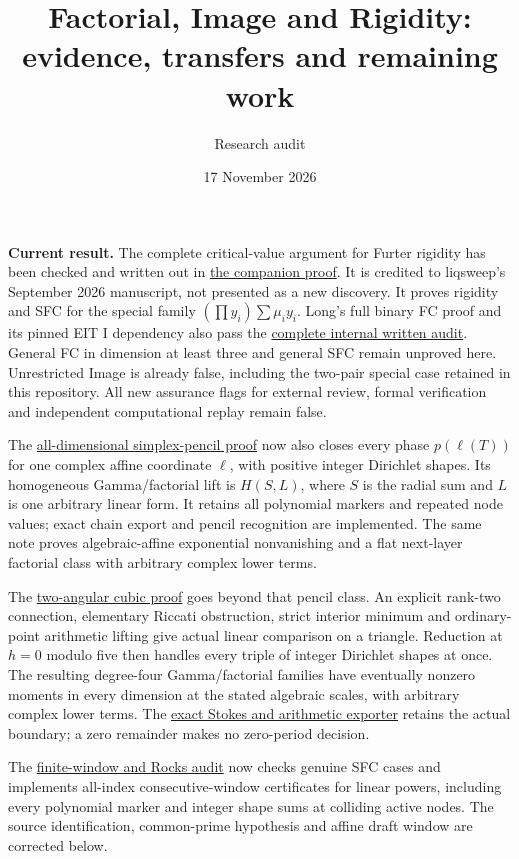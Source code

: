 \documentclass[11pt]{article}
\title{Factorial, Image and Rigidity: evidence, transfers and remaining work}
\author{Research audit}
\date{17 November 2026}
\begin{document}
\maketitle

\noindent\textbf{Current result.}
The complete critical-value argument for Furter rigidity has been checked
and written out in \href{RIGIDITY_CRITICAL_VALUES.tex}{the companion proof}.
It is credited to liqsweep's September 2026 manuscript, not presented as a
new discovery. It proves rigidity and SFC for the special family
$(\prod y_i)\sum\mu_i y_i$. Long's full binary FC proof and its pinned EIT I
dependency also pass the \href{LONG_EIT_AND_FC2_AUDIT.tex}{complete internal
written audit}. General FC in dimension at least three and general SFC
remain unproved here.
Unrestricted Image is already false, including the two-pair special case
retained in this repository. All new assurance flags for external review,
formal verification and independent computational replay remain false.

The \href{SIMPLEX_PENCILS_AND_AFFINE_LIMITS.tex}{all-dimensional simplex-pencil
proof} now also closes every phase $p(\ell(T))$ for one complex affine
coordinate $\ell$, with positive integer Dirichlet shapes. Its homogeneous
Gamma/factorial lift is $H(S,L)$, where $S$ is the radial sum and $L$ is
one arbitrary linear form. It retains all polynomial markers and repeated
node values; exact chain export and pencil recognition are implemented.
The same note proves algebraic-affine exponential nonvanishing and a flat
next-layer factorial class with arbitrary complex lower terms.

The \href{TWO_ANGULAR_COORDINATES.tex}{two-angular cubic proof} goes beyond
that pencil class. An explicit rank-two connection, elementary Riccati
obstruction, strict interior minimum and ordinary-point arithmetic lifting
give actual linear comparison on a triangle. Reduction at $h=0$ modulo five
then handles every triple of integer Dirichlet shapes at once. The resulting
degree-four Gamma/factorial families have eventually nonzero moments in
every dimension at the stated algebraic scales, with arbitrary complex
lower terms. The \href{two_angular.py}{exact Stokes and arithmetic exporter}
retains the actual boundary; a zero remainder makes no zero-period decision.

The \href{SFC_WINDOWS_AND_ROCKS_AUDIT.tex}{finite-window and Rocks audit}
now checks genuine SFC cases and implements all-index consecutive-window
certificates for linear powers, including every polynomial marker and
integer shape sums at colliding active nodes. The source identification,
common-prime hypothesis and affine draft window are corrected below.
\end{document}
